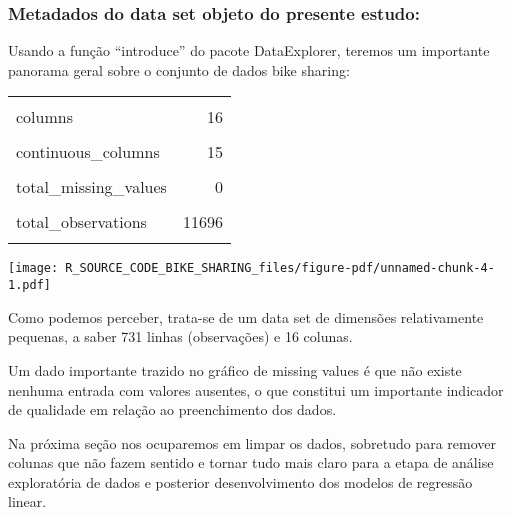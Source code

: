 \documentclass[
  letterpaper,
  DIV=11,
  numbers=noendperiod]{scrartcl}
\begin{document}
\subsubsection{Metadados do data set objeto do presente
estudo:}\label{metadados-do-data-set-objeto-do-presente-estudo}

Usando a função ``introduce'' do pacote DataExplorer, teremos um
importante panorama geral sobre o conjunto de dados bike sharing:

\begin{table}[!h]
\centering\begingroup\fontsize{8}{10}\selectfont

\begin{tabular}{lr}
\toprule
\cellcolor{gray!15}{rows} & \cellcolor{gray!15}{731}\\
columns & 16\\
\cellcolor{gray!15}{discrete\_columns} & \cellcolor{gray!15}{1}\\
continuous\_columns & 15\\
\cellcolor{gray!15}{all\_missing\_columns} & \cellcolor{gray!15}{0}\\
\addlinespace
total\_missing\_values & 0\\
\cellcolor{gray!15}{complete\_rows} & \cellcolor{gray!15}{731}\\
total\_observations & 11696\\
\cellcolor{gray!15}{memory\_usage} & \cellcolor{gray!15}{112208}\\
\bottomrule
\end{tabular}
\endgroup{}
\end{table}

\begin{center}
\texttt{[image: R\_SOURCE\_CODE\_BIKE\_SHARING\_files/figure-pdf/unnamed-chunk-4-1.pdf]}
\end{center}

Como podemos perceber, trata-se de um data set de dimensões
relativamente pequenas, a saber 731 linhas (observações) e 16 colunas.

Um dado importante trazido no gráfico de missing values é que não existe
nenhuma entrada com valores ausentes, o que constitui um importante
indicador de qualidade em relação ao preenchimento dos dados.

Na próxima seção nos ocuparemos em limpar os dados, sobretudo para
remover colunas que não fazem sentido e tornar tudo mais claro para a
etapa de análise exploratória de dados e posterior desenvolvimento dos
modelos de regressão linear.
\end{document}
